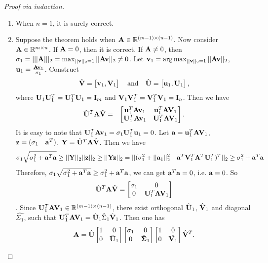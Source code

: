 \documentclass[11pt]{article}
\def\A{{\bf A}}
\def\a{{\bf a}}
\def\I{{\bf I}}
\def\U{{\bf U}}
\def\u{{\bf u}}
\def\V{{\bf V}}
\def\v{{\bf v}}
\def\Y{{\bf Y}}
\def\z{{\bf z}}
\def\BR{{\mathbb R}}
\def\Si{\mbox{\boldmath$\Sigma$\unboldmath}}
\begin{document}
\begin{proof}[Proof via induction] \hfill
\begin{enumerate}
 \item When $n=1$, it is surely correct.
 \item Suppose the theorem holds when $\A \in \BR^{(m-1) \times (n-1)}$. 
       Now consider $\A \in \BR^{m \times n}$.
       If $\A = 0$, then it is correct.
       If $\A \neq 0$, then $\sigma_1 = ||| \A |||_2 = \max_{||\v||_2 = 1} ||\A\v||_2 \neq 0$.
       Let $\v_1 = \arg\max_{||\v||_2 = 1} ||\A\v||_2$, $\u_1 = \frac{\A\v_1}{\sigma_1}$.
       Construct 
       \[ \hat{\V} = \begin{bmatrix} \v_1, \V_1 \end{bmatrix} \quad\text{and}\quad \hat{\U} = \begin{bmatrix} \u_1, \U_1 \end{bmatrix}, \]
       where $\U_1\U_1^T = \U_1^T\U_1 = \I_m$ and $\V_1\V_1^T = \V_1^T\V_1 = \I_n$. Then we have
       \begin{eqnarray*}
	  \hat{\U}^T \A \hat{\V} &=& \begin{bmatrix} \u_1^T\A\v_1 & \u_1^T\A\V_1 \\ \U_1^T\A\v_1 & \U_1^T\A\V_1 \end{bmatrix}.
       \end{eqnarray*}
       It is easy to note that $\U_1^T\A\v_1 = \sigma_1\U_1^T\u_1 = 0$. 
       Let $\a = \u_1^T\A\V_1$, $\z = (\sigma_1 \quad \a^T)$, $\Y = \hat{\U}^T \A \hat{\V}$. Then we have
       \[ \sigma_1 \sqrt{\sigma_1^2 + \a^T\a} \geq ||\Y||_2||\z||_2 \geq ||\Y\z||_2 = ||(\sigma_1^2 + ||\a_1||_2^2 \quad \a^T\V_1^T\A^T\U_1^T)^T||_2 \geq \sigma_1^2 + \a^T\a \]
       Therefore, $\sigma_1 \sqrt{\sigma_1^2 + \a^T\a} \geq \sigma_1^2 + \a^T\a$, we can get $\a^T\a = 0$, i.e. $\a = 0$. So 
       \[ \hat{\U}^T \A \hat{\V} = \begin{bmatrix} \sigma_1 & 0 \\ 0 & \U_1^T\A\V_1 \end{bmatrix} \].
       Since $\U_1^T\A\V_1 \in \BR^{(m-1)\times(n-1)}$, there exist orthogonal $\hat{\U}_1$, $\hat{\V}_1$ and diagonal $\hat{\Sigma_1}$, such that $\U_1^T\A\V_1 = \hat{\U}_1 \hat{\Sigma}_1 \hat{\V}_1$.
       Then one has 
       \[ \A = \hat{\U} \begin{bmatrix} 1 & 0 \\ 0 & \hat{\U}_1 \end{bmatrix} \begin{bmatrix} \sigma_1 & 0 \\ 0 & \hat{\Si}_1 \end{bmatrix} \begin{bmatrix} 1 & 0 \\ 0 & \hat{\V_1} \end{bmatrix} \hat{\V}^T. \]

\end{enumerate}
\end{proof}
\end{document}

